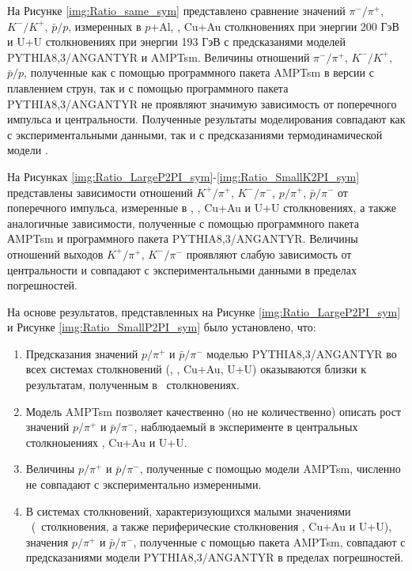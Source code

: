 На Рисунке \ref{img:Ratio_same_sym} представлено сравнение значений $\pi^{-}/\pi^{+}$, $K^{-}/K^{+}$, $\bar{p}/p$, измеренных в $p$+Al, \heau, Cu+Au столкновениях при энергии 200 ГэВ и U+U столкновениях при энергии 193 ГэВ с предсказанями моделей PYTHIA8,3/ANGANTYR и AMPTsm. Величины отношений $\pi^{-}/\pi^{+}$, $K^{-}/K^{+}$, $\bar{p}/p$, полученные как с помощью программного пакета AMPTsm в версии с плавлением струн, так и с помощью программного пакета PYTHIA8,3/ANGANTYR не проявляют значимую зависимость от поперечного импульса и центральности. Полученные результаты моделирования совпадают как с экспериментальными данными, так и с предсказаниями термодинамической модели \cite{PPG026, ThermalisationRHIC}.

На Рисунках \ref{img:Ratio_LargeP2PI_sym}-\ref{img:Ratio_SmallK2PI_sym} представлены зависимости отношений $K^{+}/\pi^{+}$, $K^{-}/\pi^{-}$, $p/\pi^{+}$, $\bar{p}/\pi^{-}$ от поперечного импульса, измеренные в \pal, \heau, Cu+Au и U+U столкновениях, а также аналогичные зависимости, полученные с помощью программного пакета АMPTsm и  программного пакета PYTHIA8,3/ANGANTYR.
Величины отношений выходов $K^{+}/\pi^{+}$, $K^{-}/\pi^{-}$ проявляют слабую зависимость от центральности и совпадают с экспериментальными данными в пределах погрешностей. 

На основе результатов, представленных на Рисунке \ref{img:Ratio_LargeP2PI_sym} и Рисунке \ref{img:Ratio_SmallP2PI_sym} было установлено, что:

\begin{enumerate}
\item Предсказания значений $p/\pi^{+}$ и $\bar{p}/\pi^{-}$ моделью PYTHIA8,3/ANGANTYR во всех системах столкновений (\pal, \heau, Cu+Au, U+U) оказываются близки к результатам, полученным в \pp \ столкновениях. 
\item Модель AMPTsm позволяет качественно (но не количественно) описать рост значений $p/\pi^{+}$ и $\bar{p}/\pi^{-}$, наблюдаемый в эксперименте в центральных столкноыениях \heau, Cu+Au и U+U.
\item Величины $p/\pi^{+}$ и $\bar{p}/\pi^{-}$, полученные с помощью модели AMPTsm, численно не совпадают с экспериментально измеренными.
\item В системах столкновений, характеризующихся малыми значениями \Npart \ (\pal \ столкновения, а также периферические столкновения \heau, Cu+Au и U+U), значения $p/\pi^{+}$ и $\bar{p}/\pi^{-}$, полученные с помощью пакета AMPTsm, совпадают с предсказаниями модели PYTHIA8,3/ANGANTYR в пределах погрешностей.
\end{enumerate}

